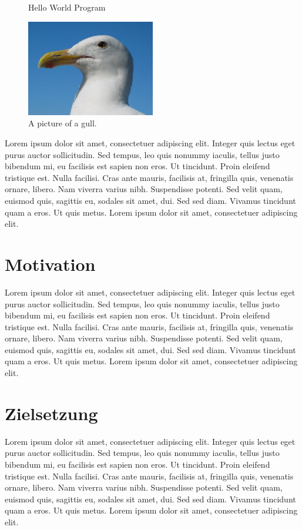 \begin{figure}[!ht]
  \centering
  \caption{Hello World Program}\label{figure:helloworld}
\end{figure}

\begin{figure}[!ht] %
  \centering
  \includegraphics[width=0.5\textwidth]{images/gull.png}
  \caption{A picture of a gull. \cite{Cerami2002}}
\end{figure}
Lorem ipsum dolor sit amet, consectetuer adipiscing elit. Integer quis lectus eget purus auctor sollicitudin. Sed tempus, leo quis nonummy
iaculis, tellus justo bibendum mi, eu facilisis est sapien non eros. Ut tincidunt. Proin eleifend tristique est. Nulla facilisi. Cras ante
mauris, facilisis at, fringilla quis, venenatis ornare, libero. Nam viverra varius nibh. Suspendisse potenti. Sed velit quam, euismod quis,
sagittis eu, sodales sit amet, dui. Sed sed diam. Vivamus tincidunt quam a eros. Ut quis metus. Lorem ipsum dolor sit amet, consectetuer adipiscing elit.

\section{Motivation}
\label{ch:1}
Lorem ipsum dolor sit amet, consectetuer adipiscing elit. Integer quis lectus eget purus auctor sollicitudin. Sed tempus, leo quis nonummy
iaculis, tellus justo bibendum mi, eu facilisis est sapien non eros. Ut tincidunt. Proin eleifend tristique est. Nulla facilisi. Cras ante
mauris, facilisis at, fringilla quis, venenatis ornare, libero. Nam viverra varius nibh. Suspendisse potenti. Sed velit quam, euismod quis,
sagittis eu, sodales sit amet, dui. Sed sed diam. Vivamus tincidunt quam a eros. Ut quis metus. Lorem ipsum dolor sit amet, consectetuer adipiscing elit.

\section{Zielsetzung}
Lorem ipsum dolor sit amet, consectetuer adipiscing elit. Integer quis lectus eget purus auctor sollicitudin. Sed tempus, leo quis nonummy
iaculis, tellus justo bibendum mi, eu facilisis est sapien non eros. Ut tincidunt. Proin eleifend tristique est. Nulla facilisi. Cras ante
mauris, facilisis at, fringilla quis, venenatis ornare, libero. Nam viverra varius nibh. Suspendisse potenti. Sed velit quam, euismod quis,
sagittis eu, sodales sit amet, dui. Sed sed diam. Vivamus tincidunt quam a eros. Ut quis metus. Lorem ipsum dolor sit amet, consectetuer adipiscing elit.

